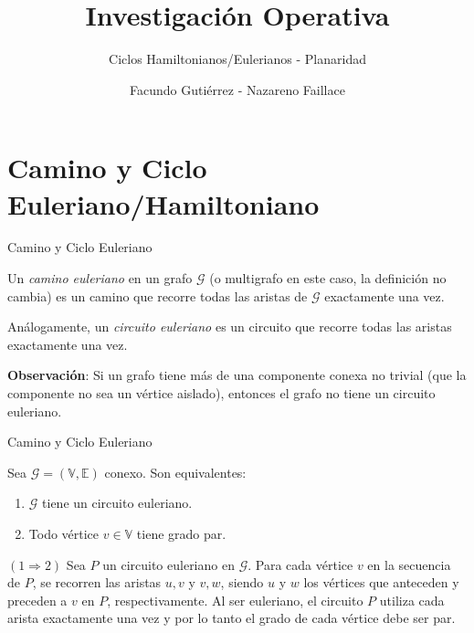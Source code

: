 \documentclass[8pt]{beamer}
\title{Investigación Operativa}
\subtitle{Ciclos Hamiltonianos/Eulerianos - Planaridad}
\date{}
\author{Facundo Gutiérrez - Nazareno Faillace}
\institute{Departamento de Matemática, FCEN, UBA}
\newcommand \anchoPagina{1.0} %
\begin{document}
\maketitle


\section{Camino y Ciclo Euleriano/Hamiltoniano}

\begin{frame}{Camino y Ciclo Euleriano}
	\begin{minipage}{\anchoPagina \textwidth}
		Un \textit{camino euleriano} en un grafo $\mathcal{G}$ (o multigrafo en este caso, la definici\'on no cambia) es un camino que recorre todas las aristas de $\mathcal{G}$ exactamente una vez.
		\pause
		
		An\'alogamente, un \textit{circuito euleriano} es un circuito que recorre todas las aristas exactamente una vez.
		
		\textbf{Observaci\'on}: Si un grafo tiene m\'as de una componente conexa no trivial (que la componente no sea un v\'ertice aislado), entonces el grafo no tiene un circuito euleriano.
		\vspace{0.2cm}

	\end{minipage}
\end{frame}

\begin{frame}{Camino y Ciclo Euleriano}
	\begin{tcolorbox}[title=Teorema]
		Sea $\mathcal{G} = (\mathbb{V},\mathbb{E})$ conexo. Son equivalentes:
		\begin{enumerate}
			\item $\mathcal{G}$ tiene un circuito euleriano.
			\item Todo v\'ertice $v\in \mathbb{V}$ tiene grado par.
		\end{enumerate} 
	\end{tcolorbox}
	
	$(1 \Rightarrow 2)$ Sea $P$ un circuito euleriano en $\mathcal{G}$. Para cada vértice $v$ en la secuencia de $P$, se recorren las aristas ${u,v}$ y ${v,w}$, siendo $u$ y $w$ los vértices que anteceden y preceden a $v$ en $P$, respectivamente. Al ser euleriano, el circuito $P$ utiliza cada arista exactamente una vez y por lo tanto el grado de cada vértice debe ser par.

    
\end{frame}
\end{document}
